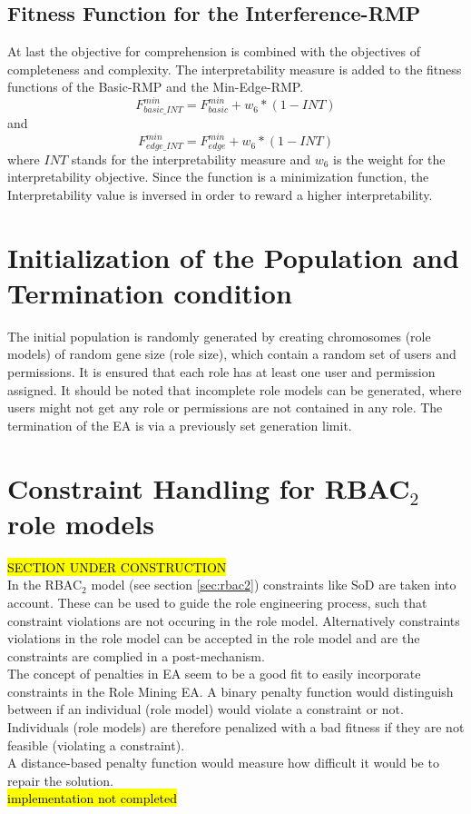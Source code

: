         \subsection{Fitness Function for the Interference-RMP}
        At last the objective for comprehension is combined with the objectives of completeness and complexity. The interpretability measure is added to the fitness functions of the Basic-RMP and the Min-Edge-RMP.        
        \begin{equation}\label{eq:FBasicMin_INT}
	        F_{basic\_INT}^{min} = F_{basic}^{min} + w_6 * (1-INT)
	    \end{equation}	    
	    and	    
	    \begin{equation}\label{eq:FEdgeMin_INT}
		    F_{edge\_INT}^{min} = F_{edge}^{min} + w_6 * (1-INT)
		\end{equation}		
		where $INT$ stands for the interpretability measure and $w_6$ is the weight for the interpretability objective. Since the function is a minimization function, the Interpretability value is inversed in order to reward a higher interpretability.
    
    \section{Initialization of the Population and Termination condition}
    The initial population is randomly generated by creating chromosomes (role models) of random gene size (role size), which contain a random set of users and permissions. It is ensured that each role has at least one user and permission assigned. It should be noted that incomplete role models can be generated, where users might not get any role or permissions are not contained in any role.
    The termination of the EA is via a previously set generation limit.
    
    \section{Constraint Handling for RBAC$_2$ role models}
    \hl{SECTION UNDER CONSTRUCTION}\\
    In the RBAC$_2$ model (see section \ref{sec:rbac2}) constraints like SoD are taken into account. These can be used to guide the role engineering process, such that constraint violations are not occuring in the role model. Alternatively constraints violations in the role model can be accepted in the role model and are the constraints are complied in a post-mechanism.\\
    The concept of penalties in EA seem to be a good fit to easily incorporate constraints in the Role Mining EA. A binary penalty function would distinguish between if an individual (role model) would violate a constraint or not. Individuals (role models) are therefore penalized with a bad fitness if they are not feasible (violating a constraint).\\
    A distance-based penalty function would measure how difficult it would be to repair the solution.\\
    \hl{implementation not completed}
        
